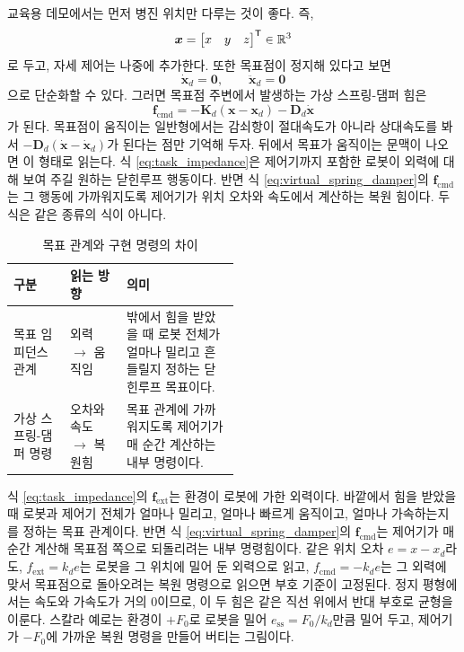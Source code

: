 교육용 데모에서는 먼저 병진 위치만 다루는 것이 좋다.
즉,
\begin{equation}
  \bm{x} =
  \begin{bmatrix}
  x & y & z
  \end{bmatrix}^{\mathsf{T}}
  \in \mathbb{R}^3
\end{equation}
로 두고, 자세 제어는 나중에 추가한다.
또한 목표점이 정지해 있다고 보면
\begin{equation}
  \dot{\bm{x}}_d = \bm{0}, \qquad \ddot{\bm{x}}_d = \bm{0}
\end{equation}
으로 단순화할 수 있다.
그러면 목표점 주변에서 발생하는 가상 스프링-댐퍼 힘은
\begin{equation}
  \bm{f}_{\mathrm{cmd}}
  =
  -\bm{K}_d(\bm{x}-\bm{x}_d)
  -
  \bm{D}_d\dot{\bm{x}}
  \label{eq:virtual_spring_damper}
\end{equation}
가 된다.
목표점이 움직이는 일반형에서는 감쇠항이 절대속도가 아니라 상대속도를 봐서 $-\bm{D}_d(\dot{\bm{x}}-\dot{\bm{x}}_d)$가 된다는 점만 기억해 두자.
뒤에서 목표가 움직이는 문맥이 나오면 이 형태로 읽는다.
%
식 \eqref{eq:task_impedance}은 제어기까지 포함한 로봇이 외력에 대해 보여 주길 원하는 닫힌루프 행동이다.
반면 식 \eqref{eq:virtual_spring_damper}의 $\bm{f}_{\mathrm{cmd}}$는 그 행동에 가까워지도록 제어기가 위치 오차와 속도에서 계산하는 복원 힘이다.
두 식은 같은 종류의 식이 아니다.

\begin{table}[!htbp]
  \centering
  \caption{목표 관계와 구현 명령의 차이}
  \small
  \setlength{\tabcolsep}{4pt}
  \begin{tabularx}{\linewidth}{@{}>{\raggedright\arraybackslash}p{0.25\linewidth}>{\raggedright\arraybackslash}p{0.25\linewidth}>{\raggedright\arraybackslash}X@{}}
    \toprule
    구분 & 읽는 방향 & 의미 \\
    \midrule
    목표 임피던스 관계 & 외력 $\rightarrow$ 움직임 & 밖에서 힘을 받았을 때 로봇 전체가 얼마나 밀리고 흔들릴지 정하는 닫힌루프 목표이다. \\
    가상 스프링-댐퍼 명령 & 오차와 속도 $\rightarrow$ 복원힘 & 목표 관계에 가까워지도록 제어기가 매 순간 계산하는 내부 명령이다. \\
    \bottomrule
  \end{tabularx}
\end{table}

식 \eqref{eq:task_impedance}의 $\bm{f}_{\mathrm{ext}}$는 환경이 로봇에 가한 외력이다.
바깥에서 힘을 받았을 때 로봇과 제어기 전체가 얼마나 밀리고, 얼마나 빠르게 움직이고, 얼마나 가속하는지를 정하는 목표 관계이다.
반면 식 \eqref{eq:virtual_spring_damper}의 $\bm{f}_{\mathrm{cmd}}$는 제어기가 매 순간 계산해 목표점 쪽으로 되돌리려는 내부 명령힘이다.
같은 위치 오차 $e=x-x_d$라도, $f_{\mathrm{ext}}=k_de$는 로봇을 그 위치에 밀어 둔 외력으로 읽고, $f_{\mathrm{cmd}}=-k_de$는 그 외력에 맞서 목표점으로 돌아오려는 복원 명령으로 읽으면 부호 기준이 고정된다.
정지 평형에서는 속도와 가속도가 거의 0이므로, 이 두 힘은 같은 직선 위에서 반대 부호로 균형을 이룬다.
스칼라 예로는 환경이 $+F_0$로 로봇을 밀어 $e_{\mathrm{ss}}=F_0/k_d$만큼 밀어 두고, 제어기가 $-F_0$에 가까운 복원 명령을 만들어 버티는 그림이다.

